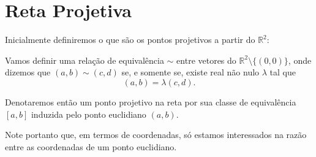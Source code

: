 \chapter{Reta Projetiva}

Inicialmente definiremos o que são os pontos projetivos a partir do $\mathbb{R}^2$:

\begin{defn}
Vamos definir uma relação de equivalência \(\sim\) entre vetores do $\mathbb{R}^2 \setminus \{(0, 0)\}$,
onde dizemos que \((a,b) \sim (c,d)\) se, e somente se, existe real não nulo \(\lambda\) tal que \[(a,b)=\lambda (c,d).\]

Denotaremos então um ponto projetivo na reta por sua classe de equivalência $[a,b]$ induzida pelo ponto euclidiano $(a,b)$.
\end{defn} 

Note portanto que, em termos de coordenadas, só estamos interessados na razão entre as coordenadas de um ponto euclidiano.
